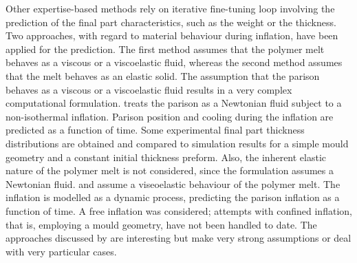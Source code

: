 Other expertise-based methods rely on iterative fine-tuning loop involving the prediction of the final part characteristics, such as the weight or the thickness. Two approaches, with regard to material behaviour during inflation, have been applied for the prediction. The first method assumes that the polymer melt behaves as a viscous or a viscoelastic fluid, whereas the second method assumes that the melt behaves as an elastic solid. The assumption that the parison behaves as a viscous or a viscoelastic fluid results in a very complex computational formulation. \citet{poslinski1990nonisothermal} treats the parison as a Newtonian fluid subject to a non-isothermal inflation. Parison position and cooling during the inflation are predicted as a function of time. Some experimental final part thickness distributions are obtained and compared to simulation results for a simple mould geometry and a constant initial thickness preform. Also, the inherent elastic nature of the polymer melt is not considered, since the formulation assumes a Newtonian fluid. \cite{ryan1982dynamics} and \citet{khayat1992inflation} assume a viseoelastic behaviour of the polymer melt. The inflation is modelled as a dynamic process, predicting the parison inflation as a function of time. A free inflation was considered; attempts with confined inflation, that is, employing a mould geometry, have not been handled to date. 
The approaches discussed by \citet{poslinski1990nonisothermal,ryan1982dynamics,khayat1992inflation} are interesting but make very strong assumptions or deal with very particular cases.

